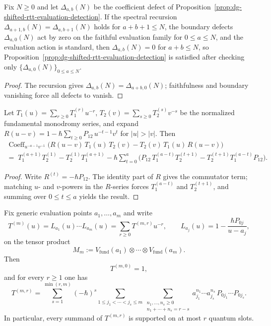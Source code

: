 \begin{proposition}
\label{prop:dg-shifted-rtt-boundary-seed}
Fix $N \ge 0$ and let $\Delta_{a,b}(N)$ be the coefficient defect of
Proposition~\ref{prop:dg-shifted-rtt-evaluation-detection}. If the
spectral recursion $\Delta_{a+1,b}(N)=\Delta_{a,b+1}(N)$ holds for
$a+b+1\le N$, the boundary defects $\Delta_{a,0}(N)$ act by zero on the
faithful evaluation family for $0\le a\le N$, and the evaluation action
is standard, then $\Delta_{a,b}(N)=0$ for $a+b\le N$, so
Proposition~\ref{prop:dg-shifted-rtt-evaluation-detection} is satisfied
after checking only $\{\Delta_{a,0}(N)\}_{0 \le a \le N}$.
\end{proposition}

\begin{proof}
The recursion gives $\Delta_{a,b}(N)=\Delta_{a+b,0}(N)$; faithfulness
and boundary vanishing force all defects to vanish.
\end{proof}

\begin{proposition}
\label{prop:dg-shifted-rtt-boundary-coefficient-formula}
Let $T_1(u)=\sum_{r\ge 0} T_1^{(r)}u^{-r}$,
$T_2(v)=\sum_{s\ge 0} T_2^{(s)}v^{-s}$ be the normalized fundamental
monodromy series, and expand
$R(u-v)=1-\hbar\sum_{t\ge 0} P_{12}\,u^{-t-1}v^t$ for $|u|>|v|$.
Then
\begin{multline*}
\operatorname{Coeff}_{u^{-a-1}v^{-1}}
\bigl(
R(u\!-\!v)\,T_1(u)\,T_2(v)-T_2(v)\,T_1(u)\,R(u\!-\!v)
\bigr)\\
=\;
T_1^{(a+1)}T_2^{(1)}-T_2^{(1)}T_1^{(a+1)}
-\hbar\!\sum_{t=0}^{a}\!
\bigl(
P_{12}\,T_1^{(a-t)}T_2^{(t+1)}
-T_2^{(t+1)}T_1^{(a-t)}P_{12}
\bigr).
\end{multline*}
\end{proposition}

\begin{proof}
Write $R^{(t)}=-\hbar P_{12}$. The identity part of $R$ gives the
commutator term; matching $u$- and $v$-powers in the $R$-series forces
$T_1^{(a-t)}$ and $T_2^{(t+1)}$, and summing over $0\le t\le a$ yields
the result.
\end{proof}

\begin{proposition}
\label{prop:dg-shifted-rtt-fundamental-coefficient-formula}
Fix generic evaluation points $a_1,\dots,a_m$ and write
\[
T^{(m)}(u)=L_{a_1}(u)\cdots L_{a_m}(u)
=\sum_{r\ge0}T^{(m,r)}u^{-r},
\qquad
L_{a_j}(u)=1-\frac{\hbar P_{0j}}{u-a_j},
\]
on the tensor product
\[
M_m:=V_{\mathrm{fund}}(a_1)\otimes\cdots\otimes
V_{\mathrm{fund}}(a_m).
\]
Then
\[
T^{(m,0)}=1,
\]
and for every $r\ge1$ one has
\[
T^{(m,r)}
=
\sum_{s=1}^{\min(r,m)}(-\hbar)^s
\sum_{1\le j_1<\cdots<j_s\le m}
\sum_{\substack{n_1,\dots,n_s\ge0\\ n_1+\cdots+n_s=r-s}}
a_{j_1}^{n_1}\cdots a_{j_s}^{n_s}\,
P_{0j_1}\cdots P_{0j_s}.
\]
In particular, every summand of $T^{(m,r)}$ is supported on at most
$r$ quantum slots.
\end{proposition}

